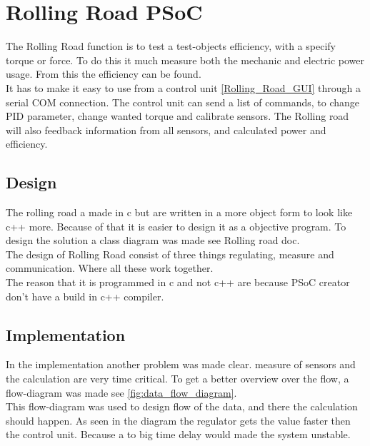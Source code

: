 \section{Rolling Road PSoC}
The Rolling Road function is to test a test-objects efficiency, with a specify torque or force. To do this it much measure both the mechanic and electric power usage. From this the efficiency can be found.\\

It has to make it easy to use from a control unit \vref{Rolling_Road_GUI} through a serial COM connection. The control unit can send a list of commands, to change PID parameter, change wanted torque and calibrate sensors. The Rolling road will also feedback information from all sensors, and calculated power and efficiency.\\
\subsection{Design}
The rolling road a made in c but are written in a more object form to look like c++ more. Because of that it is easier to design it as a objective program. To design the solution a class diagram was made see Rolling road doc.\\

The design of Rolling Road consist of three things regulating, measure and communication. Where all these work together.\\

The reason that it is programmed in c and not c++ are because PSoC creator don't have a build in c++ compiler. 
\subsection{Implementation}
In the implementation another problem was made clear. measure of sensors and the calculation are very time critical. To get a better overview over the flow, a flow-diagram was made see \vref{fig:data_flow_diagram}.\\

This flow-diagram was used to design flow of the data, and there the calculation should happen. As seen in the diagram the regulator gets the value faster then the control unit. Because a to big time delay would made the system unstable.\\

